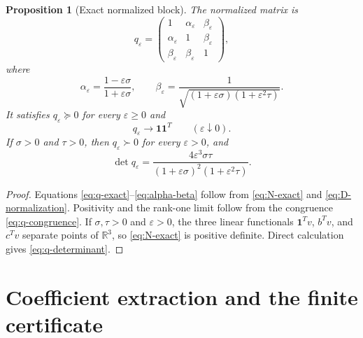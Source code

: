 \documentclass[11pt]{article}
\newtheorem{proposition}[theorem]{Proposition}
\newcommand{\one}{\mathbf 1}
\newcommand{\R}{\mathbb R}
\newcommand{\eps}{\varepsilon}
\begin{document}
\begin{proposition}[Exact normalized block]
\label{prop:exact-q}
The normalized matrix is
\begin{equation}
  q_\eps=
  \begin{pmatrix}
  1&\alpha_\eps&\beta_\eps\\
  \alpha_\eps&1&\beta_\eps\\
  \beta_\eps&\beta_\eps&1
  \end{pmatrix},
  \label{eq:q-exact}
\end{equation}
where
\begin{equation}
  \alpha_\eps=\frac{1-\eps\sigma}{1+\eps\sigma},
  \qquad
  \beta_\eps=\frac{1}{\sqrt{(1+\eps\sigma)(1+\eps^2\tau)}}.
  \label{eq:alpha-beta}
\end{equation}
It satisfies $q_\eps\succeq0$ for every $\eps\ge0$ and
\begin{equation}
  q_\eps\longrightarrow\one\one^T
  \qquad(\eps\downarrow0).
  \label{eq:q-rank-one-limit}
\end{equation}
If $\sigma>0$ and $\tau>0$, then $q_\eps\succ0$ for every $\eps>0$, and
\begin{equation}
  \det q_\eps
  =\frac{4\eps^3\sigma\tau}
  {(1+\eps\sigma)^2(1+\eps^2\tau)}.
  \label{eq:q-determinant}
\end{equation}
\end{proposition}

\begin{proof}
Equations \eqref{eq:q-exact}--\eqref{eq:alpha-beta} follow from \eqref{eq:N-exact} and \eqref{eq:D-normalization}.  Positivity and the rank-one limit follow from the congruence \eqref{eq:q-congruence}.  If $\sigma,\tau>0$ and $\eps>0$, the three linear functionals $\one^Tv$, $b^Tv$, and $c^Tv$ separate points of $\R^3$, so \eqref{eq:N-exact} is positive definite.  Direct calculation gives \eqref{eq:q-determinant}.
\end{proof}

\section{Coefficient extraction and the finite certificate}
\label{sec:finite-certificate}
\end{document}

